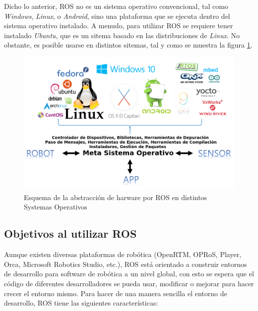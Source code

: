 Dicho lo anterior, ROS no es un sistema operativo convencional, tal como \textit{Windows}, \textit{Linux}, o \textit{Android}, sino una plataforma que se ejecuta dentro del sistema operativo instalado. A menudo, para utilizar ROS se requiere tener instalado \textit{Ubuntu}, que es un sitema basado en las distribuciones de \textit{Linux}. No obstante, es posible usarse en distintos sitemas, tal y como se muestra la figura \ref{fig:meta_operating_system}. 
\begin{figure}
\centering
\includegraphics[scale=0.5]{images/meta_operating_system.png}
\caption{Esquema de la abstracción de harware por ROS en distintos Systemas Operativos}
\label{fig:meta_operating_system}
\end{figure} 

		\subsection*{Objetivos al utilizar ROS}
Aunque existen diversas plataformas de robótica (OpenRTM, OPRoS, Player, Orca, Microsoft Robotics Studio, etc.), ROS está orientado a construir entornos de desarrollo para software de robótica a un nivel global, con esto se espera que el código de diferentes desarrolladores se pueda usar, modificar o mejorar para hacer crecer el entorno mismo. Para hacer de una manera sencilla el entorno de desarrollo, ROS tiene las siguientes características:

